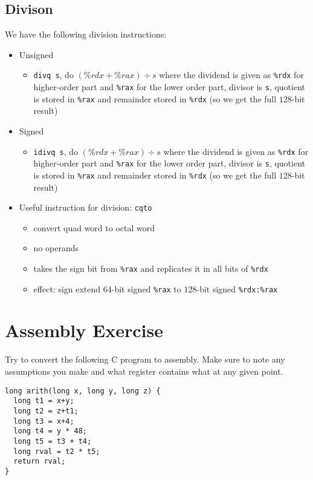 \documentclass [10pt]{article}
\begin{document}
\subsection{Divison}
We have the following division instructions:
\begin{itemize}
  \item Unsigned
  \begin{itemize}
    \item \verb|divq s|, do $(\%rdx+\%rax)\div s$ where the dividend is given as \verb|%rdx| for higher-order part and \verb|%rax| for the lower order part, divisor is \verb|s|, quotient is stored in \verb|%rax| and remainder stored in \verb|%rdx| (so we get the full $128$-bit result)
  \end{itemize}
  \item Signed
  \begin{itemize}
    \item \verb|idivq s|, do $(\%rdx+\%rax)\div s$ where the dividend is given as \verb|%rdx| for higher-order part and \verb|%rax| for the lower order part, divisor is \verb|s|, quotient is stored in \verb|%rax| and remainder stored in \verb|%rdx| (so we get the full $128$-bit result)
  \end{itemize}
  \item Useful instruction for division: \verb|cqto|
  \begin{itemize}
    \item convert quad word to octal word
    \item no operands
    \item takes the sign bit from \verb|%rax| and replicates it in all bits of \verb|%rdx|
    \item effect: sign extend 64-bit signed \verb|%rax| to $128$-bit signed \verb|%rdx:%rax|
  \end{itemize}
\end{itemize}

\section{Assembly Exercise}

Try to convert the following C program to assembly. Make sure to note any assumptions you make and what register contains what at any given point.

\begin{verbatim}
long arith(long x, long y, long z) {
  long t1 = x+y;
  long t2 = z+t1;
  long t3 = x+4;
  long t4 = y * 48;
  long t5 = t3 + t4;
  long rval = t2 * t5;
  return rval;
}
\end{verbatim}
\end{document}
